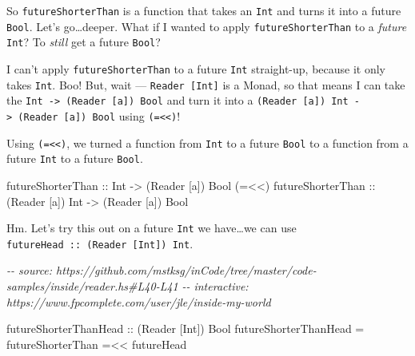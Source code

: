 \documentclass[]{article}
\newenvironment{Shaded}{}{}
\newcommand{\CommentTok}[1]{\textcolor[rgb]{0.38,0.63,0.69}{\textit{#1}}}
\newcommand{\DataTypeTok}[1]{\textcolor[rgb]{0.56,0.13,0.00}{#1}}
\newcommand{\NormalTok}[1]{#1}
\newcommand{\OperatorTok}[1]{\textcolor[rgb]{0.40,0.40,0.40}{#1}}
\newcommand{\OtherTok}[1]{\textcolor[rgb]{0.00,0.44,0.13}{#1}}
\begin{document}
So \texttt{futureShorterThan} is a function that takes an \texttt{Int} and turns
it into a future \texttt{Bool}. Let's go\ldots deeper. What if I wanted to apply
\texttt{futureShorterThan} to a \emph{future} \texttt{Int}? To \emph{still} get
a future \texttt{Bool}?

I can't apply \texttt{futureShorterThan} to a future \texttt{Int} straight-up,
because it only takes \texttt{Int}. Boo! But, wait ---
\texttt{Reader\ {[}Int{]}} is a Monad, so that means I can take the
\texttt{Int\ -\textgreater{}\ (Reader\ {[}a{]})\ Bool} and turn it into a
\texttt{(Reader\ {[}a{]})\ Int\ -\textgreater{}\ (Reader\ {[}a{]})\ Bool} using
\texttt{(=\textless{}\textless{})}!

Using \texttt{(=\textless{}\textless{})}, we turned a function from \texttt{Int}
to a future \texttt{Bool} to a function from a future \texttt{Int} to a future
\texttt{Bool}.

\begin{Shaded}
\begin{Highlighting}[]
\OtherTok{futureShorterThan       ::} \DataTypeTok{Int}              \OtherTok{{-}\textgreater{}}\NormalTok{ (}\DataTypeTok{Reader}\NormalTok{ [a]) }\DataTypeTok{Bool}
\NormalTok{(}\OperatorTok{=\textless{}\textless{}}\NormalTok{)}\OtherTok{ futureShorterThan ::}\NormalTok{ (}\DataTypeTok{Reader}\NormalTok{ [a]) }\DataTypeTok{Int} \OtherTok{{-}\textgreater{}}\NormalTok{ (}\DataTypeTok{Reader}\NormalTok{ [a]) }\DataTypeTok{Bool}
\end{Highlighting}
\end{Shaded}

Hm. Let's try this out on a future \texttt{Int} we have\ldots we can use
\texttt{futureHead\ ::\ (Reader\ {[}Int{]})\ Int}.

\begin{Shaded}
\begin{Highlighting}[]
\CommentTok{{-}{-} source: https://github.com/mstksg/inCode/tree/master/code{-}samples/inside/reader.hs\#L40{-}L41}
\CommentTok{{-}{-} interactive: https://www.fpcomplete.com/user/jle/inside{-}my{-}world}

\OtherTok{futureShorterThanHead ::}\NormalTok{ (}\DataTypeTok{Reader}\NormalTok{ [}\DataTypeTok{Int}\NormalTok{]) }\DataTypeTok{Bool}
\NormalTok{futureShorterThanHead }\OtherTok{=}\NormalTok{ futureShorterThan }\OperatorTok{=\textless{}\textless{}}\NormalTok{ futureHead}
\end{Highlighting}
\end{Shaded}
\end{document}
